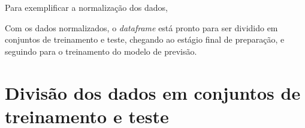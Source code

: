Para exemplificar a normalização dos dados, 

Com os dados normalizados, o \textit{dataframe} está pronto para ser dividido em conjuntos de treinamento e teste, chegando ao estágio final de preparação, e seguindo para o treinamento do modelo de previsão. 

\section{Divisão dos dados em conjuntos de treinamento e teste}





